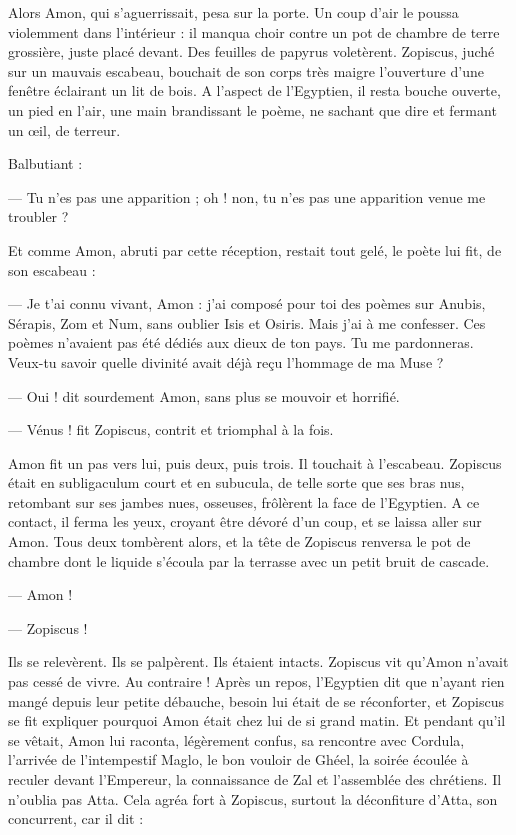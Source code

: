 \documentclass[a4paper, 11pt, oneside, polutonikogreek, french]{article}
\begin{document}
Alors Amon, qui s'aguerrissait, pesa sur la porte. Un coup d'air le poussa violemment dans l'intérieur : il manqua choir contre un pot de chambre de terre grossière, juste placé devant. Des feuilles de papyrus voletèrent. Zopiscus, juché sur un mauvais escabeau, bouchait de son corps très maigre l'ouverture d'une fenêtre éclairant un lit de bois. A l'aspect de l'Egyptien, il resta bouche ouverte, un pied en l'air, une main brandissant le poème, ne sachant que dire et fermant un œil, de terreur.

Balbutiant :

--- Tu n'es pas une apparition ; oh ! non, tu n'es pas une apparition venue me troubler ?

Et comme Amon, abruti par cette réception, restait tout gelé, le poète lui fit, de son escabeau :

--- Je t'ai connu vivant, Amon : j'ai composé pour toi des poèmes sur Anubis, Sérapis, Zom et Num, sans oublier Isis et Osiris. Mais j'ai à me confesser. Ces poèmes n'avaient pas été dédiés aux dieux de ton pays. Tu me pardonneras. Veux-tu savoir quelle divinité avait déjà reçu l'hommage de ma Muse ?

--- Oui ! dit sourdement Amon, sans plus se mouvoir et horrifié.

--- Vénus ! fit Zopiscus, contrit et triomphal à la fois.

Amon fit un pas vers lui, puis deux, puis trois. Il touchait à l'escabeau. Zopiscus était en subligaculum court et en subucula, de telle sorte que ses bras nus, retombant sur ses jambes nues, osseuses, frôlèrent la face de l'Egyptien. A ce contact, il ferma les yeux, croyant être dévoré d'un coup, et se laissa aller sur Amon. Tous deux tombèrent alors, et la tête de Zopiscus renversa le pot de chambre dont le liquide s'écoula par la terrasse avec un petit bruit de cascade.

--- Amon !

--- Zopiscus !

Ils se relevèrent. Ils se palpèrent. Ils étaient intacts. Zopiscus vit qu'Amon n'avait pas cessé de vivre. Au contraire ! Après un repos, l'Egyptien dit que n'ayant rien mangé depuis leur petite débauche, besoin lui était de se réconforter, et Zopiscus se fit expliquer pourquoi Amon était chez lui de si grand matin. Et pendant qu'il se vêtait, Amon lui raconta, légèrement confus, sa rencontre avec Cordula, l'arrivée de l'intempestif Maglo, le bon vouloir de Ghéel, la soirée écoulée à reculer devant l'Empereur, la connaissance de Zal et l'assemblée des chrétiens. Il n'oublia pas Atta. Cela agréa fort à Zopiscus, surtout la déconfiture d'Atta, son concurrent, car il dit :
\end{document}
